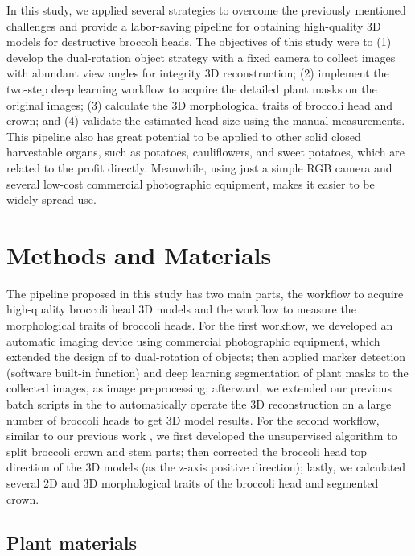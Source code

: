 In this study, we applied several strategies to overcome the previously mentioned challenges and provide a labor-saving pipeline for obtaining high-quality 3D models for destructive broccoli heads. The objectives of this study were to (1) develop the dual-rotation object strategy with a fixed camera to collect images with abundant view angles for integrity 3D reconstruction; (2) implement the two-step deep learning workflow to acquire the detailed plant masks on the original images; (3) calculate the 3D morphological traits of broccoli head and crown; and (4) validate the estimated head size using the manual measurements. This pipeline also has great potential to be applied to other solid closed harvestable organs, such as potatoes, cauliflowers, and sweet potatoes, which are related to the profit directly. Meanwhile, using just a simple RGB camera and several low-cost commercial photographic equipment, makes it easier to be widely-spread use.


\section{Methods and Materials}

The pipeline proposed in this study has two main parts, the workflow to acquire high-quality broccoli head 3D models and the workflow to measure the morphological traits of broccoli heads. For the first workflow, we developed an automatic imaging device using commercial photographic equipment, which extended the design of \citet{kochi_3d_2018} to dual-rotation of objects; then applied marker detection (software built-in function) and deep learning segmentation of plant masks to the collected images, as image preprocessing; afterward, we extended our previous batch scripts in the \citet{feldman_easydcp_2021} to automatically operate the 3D reconstruction on a large number of broccoli heads to get 3D model results. For the second workflow, similar to our previous work \citep{feldman_easydcp_2021}, we first developed the unsupervised algorithm to split broccoli crown and stem parts; then corrected the broccoli head top direction of the 3D models (as the z-axis positive direction); lastly, we calculated several 2D and 3D morphological traits of the broccoli head and segmented crown.

\subsection{Plant materials}


